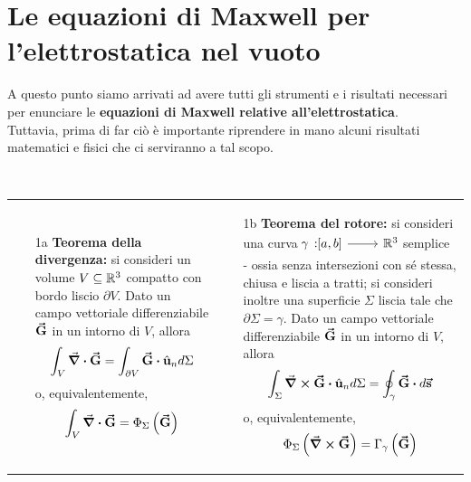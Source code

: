 \section{Le equazioni di Maxwell per l'elettrostatica nel vuoto}
A questo punto siamo arrivati ad avere tutti gli strumenti e i risultati necessari per enunciare le \textbf{equazioni di Maxwell relative all'elettrostatica}.\\
Tuttavia, prima di far ciò è importante riprendere in mano alcuni risultati matematici e fisici che ci serviranno a tal scopo.%
\begin{remember}~\\
		\begin{tabular}{p{}p{}}
			\begin{itemize}
				\item[1a] \textbf{Teorema della divergenza:} si consideri un volume $V\subseteq\mathbb{R}^3$ compatto con bordo liscio $\partial V$. Dato un campo vettoriale differenziabile $\vb*{\va{G}}$ in un intorno di $V$, allora
				\begin{equation*}
					\int_V\div{\vba{G}}=\int_{\partial V}\vba{G}\vdot \vbh{u}_nd\Sigma
				\end{equation*}
				o, equivalentemente,
				\begin{equation*}
					\int_V\div{\vb*{\va{G}}}=\Phi_\Sigma\left(\vb*{\va{G}}\right)
				\end{equation*}
			\end{itemize} &
			\begin{itemize}
			\item[1b] \textbf{Teorema del rotore:} si consideri una curva $\funz[\gamma]{\left[a,b\right]}{\realset^3}$ semplice - ossia senza intersezioni con sé stessa, chiusa e liscia a tratti; si consideri inoltre una superficie $\Sigma$ liscia tale che $\partial \Sigma=\gamma$. Dato un campo vettoriale differenziabile $\vb*{\va{G}}$ in un intorno di $V$, allora
			\begin{equation*}
				\int_\Sigma\curl{\vba{G}}\vdot\vbh{u}_nd\Sigma=\oint_{\gamma}\vba{G}\vdot d\vba{s}
			\end{equation*}
			o, equivalentemente,
			\begin{equation*}
				\Phi_\Sigma\left(\curl{\vb*{\va{G}}}\right)=\Gamma_\gamma\left(\vb*{\va{G}}\right)
			\end{equation*}
		\end{itemize}\end{tabular}\\
		\begin{tabular}{p{}p{}}

\end{tabular}
\end{remember}
